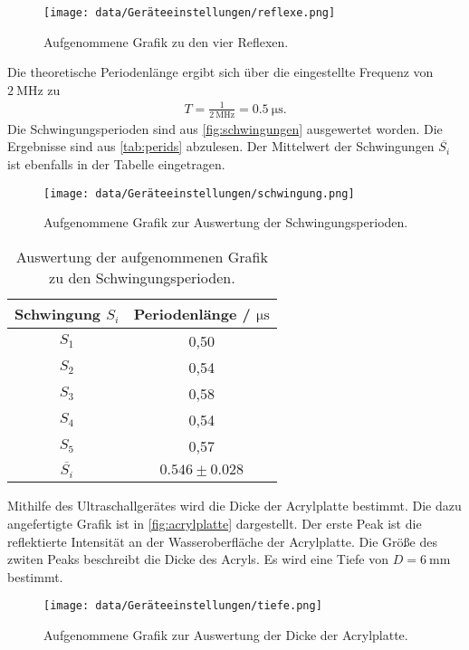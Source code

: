 \begin{figure}[H]
  \centering
  \texttt{[image: data/Geräteeinstellungen/reflexe.png]}
  \caption{Aufgenommene Grafik zu den vier Reflexen.}
  \label{fig:schwingungen}
\end{figure}

Die theoretische Periodenlänge ergibt sich über die eingestellte Frequenz von $\SI{2}{\mega\hertz}$ zu 
\begin{align*}
  T = \frac{1}{\SI{2}{\mega\hertz}} = \SI{0,5}{\micro\second}.
\end{align*}
Die Schwingungsperioden sind aus \autoref{fig:schwingungen} ausgewertet worden. Die Ergebnisse sind aus \autoref{tab:perids} abzulesen.
Der Mittelwert der Schwingungen $\overline{S_i}$ ist ebenfalls in der Tabelle eingetragen.

\begin{figure}[H]
  \centering
  \texttt{[image: data/Geräteeinstellungen/schwingung.png]}
  \caption{Aufgenommene Grafik zur Auswertung der Schwingungsperioden.}
  \label{fig:schwingungen}
\end{figure}

\begin{table}
  \centering
  \caption{Auswertung der aufgenommenen Grafik zu den Schwingungsperioden.}
  \label{tab:perids}
  \begin{tabular}{c c}
    \toprule
    Schwingung $S_i$ & Periodenlänge / $\si{\micro\second}$  \\
    \midrule
    $S_1$ & 0,50 \\
    $S_2$ & 0,54 \\
    $S_3$ & 0,58 \\
    $S_4$ & 0,54 \\
    $S_5$ & 0,57 \\
    $\overline{S_i}$ & $0.546 \pm 0.028$ \\
    \bottomrule
  \end{tabular}
\end{table}

Mithilfe des Ultraschallgerätes wird die Dicke der Acrylplatte bestimmt. Die dazu angefertigte Grafik ist in \autoref{fig:acrylplatte} dargestellt.
Der erste Peak ist die reflektierte Intensität an der Wasseroberfläche der Acrylplatte. Die Größe des zwiten Peaks beschreibt die Dicke des Acryls.
Es wird eine Tiefe von $D = \SI{6}{\milli\meter}$ bestimmt.

\begin{figure}[H]
  \centering
  \texttt{[image: data/Geräteeinstellungen/tiefe.png]}
  \caption{Aufgenommene Grafik zur Auswertung der Dicke der Acrylplatte.}
  \label{fig:acrylplatte}
\end{figure}

